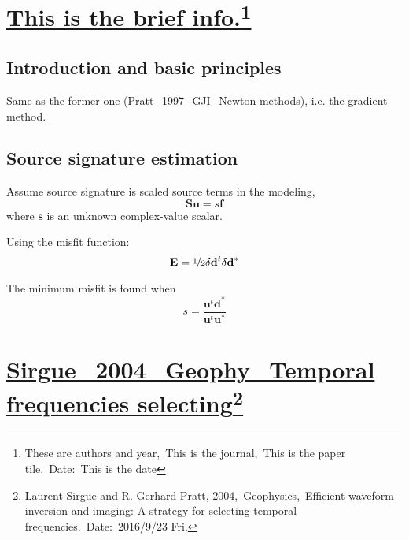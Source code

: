\documentclass{article}
\newcommand{\Ppath}{/home/tche/Learning/Learning/Paper/}
\newcommand{\prf}{This is relative path from \Papth to the paper file}
\newcommand{\pmk}{This is the brief info.}
\newcommand{\pti}{This is the paper tile}
\newcommand{\pay}{These are authors and year}
\newcommand{\pjo}{This is the journal}
\newcommand{\pda}{This is the date}
\newcommand{\refp}[1]{\href{run:\Ppath\prf}{#1}}
\newcommand{\pinfo}{\refp{\pmk}\footnote{\pay,~\pjo,~\pti.~Date:~\pda}}
\newcommand{\mbf}[1]{\mathbf{#1}}
\begin{document}
\section{\pinfo}
\subsection{Introduction and basic principles}
Same as the former one (Pratt\_1997\_GJI\_Newton methods), i.e. the gradient method.\par
\subsection{Source signature estimation}
Assume source signature is scaled source terms in the modeling,
\[ \mbf S\mbf u=s\mbf f\]
where $\mbf s$ is an unknown complex-value scalar.\par
Using the misfit function:
\[ \mbf E=\nicefrac{1}{2}\delta\mbf d^t\delta\mbf d^* \]\par
The minimum misfit is found when
\[ s=\frac{\mbf u^t\mbf d^*}{\mbf u^t\mbf u^*} \]\par
\vspace{5mm}

\renewcommand{\pmk}{Sirgue\_2004\_Geophy\_Temporal frequencies selecting}
\renewcommand{\prf}{FWI/\pmk.pdf}
\renewcommand{\pti}{Efficient waveform inversion and imaging: A strategy for selecting temporal frequencies}
\renewcommand{\pay}{Laurent Sirgue and R. Gerhard Pratt, 2004}
\renewcommand{\pjo}{Geophysics}
\renewcommand{\pda}{2016/9/23 Fri.}
\section{\pinfo}
\end{document}
